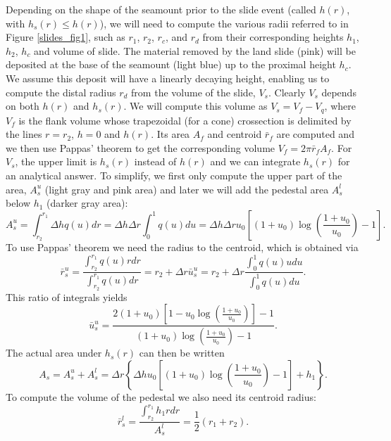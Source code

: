\documentclass[12pt,letterpaper,margin=0.5in]{report}
\begin{document}
Depending on the shape of the seamount prior to the slide event (called $h(r)$, with $h_s(r) \le h(r)$), we will need to compute the various radii referred
to in Figure \ref{slides_fig1}, such as $r_1$, $r_2$, $r_c$, and $r_d$ from their corresponding heights $h_1$, $h_2$, $h_c$ and volume of slide.
The material removed by the land slide (pink)
will be deposited at the base of the seamount (light blue) up to the proximal height $h_c$.  We assume this deposit will have a linearly
decaying height, enabling us to compute the distal radius $r_d$ from the volume of the slide, $V_s$.  Clearly $V_s$ depends
on both $h(r)$ and $h_s(r)$.  We will compute this volume as $V_s = V_f - V_q$, where $V_f$ is the flank volume whose
trapezoidal (for a cone) crossection is delimited by the lines $r = r_2$, $h = 0$ and $h(r)$.  Its area $A_f$ and centroid $\bar{r}_f$ are computed and
we then use Pappas' theorem to get the corresponding volume $V_f = 2 \pi \bar{r}_f A_f$.  For $V_s$, the upper limit is $h_s(r)$ instead of $h(r)$ and we can integrate
$h_s(r)$ for an analytical answer. To simplify, we first only compute the upper part of the area, $A^u_s$ (light gray and pink area)
and later we will add the pedestal area $A^l_s$ below $h_1$ (darker gray area):
\begin{equation}
A^u_s = \int_{r_2}^{r_1} \Delta h q(u) dr = \Delta h \Delta r \int_0^1 q(u) du = \Delta h \Delta r u_0 \left [ (1 + u_0) \log \left (\frac{1 + u_0}{u_0} \right ) - 1 \right ].
\end{equation}
To use Pappas' theorem we need the radius to the centroid, which is obtained via
\begin{equation}
\bar{r}^u_s = \frac{\int_{r_2}^{r_1}q(u)rdr}{\int_{r_2}^{r_1}q(u)dr} = r_2 + \Delta r \bar{u}_s^u = r_2 + \Delta r \frac{\int_0^1q(u)udu}{\int_0^1 q(u)du}.
\end{equation}
This ratio of integrals yields
\begin{equation}
\bar{u}^u_s = \frac{2(1 + u_0)\left [1 - u_0 \log \left ( \frac{1+u_0}{u_0} \right ) \right ] - 1}{(1 + u_0) \log \left (\frac{1 + u_0}{u_0} \right ) - 1}.
\end{equation}
The actual area under $h_s(r)$ can then be written
\begin{equation}
A_s = A^u_s + A^l_s =  \Delta r \left \{\Delta h u_0 \left [ (1 + u_0) \log \left (\frac{1 + u_0}{u_0} \right ) - 1 \right ] + h_1 \right \}.
\end{equation}
To compute the volume of the pedestal we also need its centroid radius:
\begin{equation}
\bar{r}^l_s = \frac{\int_{r_2}^{r_1} h_1 rdr}{A^l_s} = \frac{1}{2} (r_1 + r_2).
\end{equation}
\end{document}
